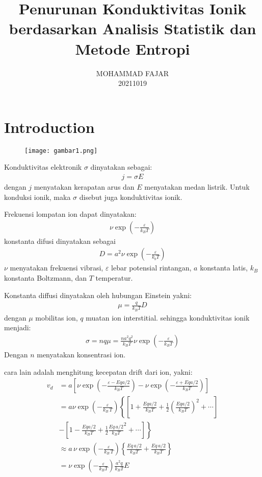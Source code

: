 \documentclass[a4paper , 12pt, cc]{article}
\title{Penurunan Konduktivitas Ionik berdasarkan Analisis Statistik dan Metode Entropi}
\author{MOHAMMAD FAJAR\\
20211019}
\begin{document}
\setlength \belowdisplayskip{2 pt} 
\setlength \abovedisplayskip{2 pt}
\maketitle

\section{Introduction}
\begin{figure}
\centering
\texttt{[image: gambar1.png]}
\end{figure}
Konduktivitas elektronik $\sigma$ dinyatakan sebagai:
\begin{align}
j = \sigma E \label{pers .1}
\end{align}
dengan $j$ menyatakan kerapatan arus dan $E$ menyatakan medan listrik. Untuk konduksi ionik, maka $\sigma$ disebut juga konduktivitas ionik. 

Frekuensi lompatan ion dapat dinyatakan:
\begin{align}
\nu \exp \left( - \frac{\varepsilon}{k_B T} \right)
\end{align}
konstanta difusi dinyatakan sebagai 
\begin{align}
D = a^2 \nu  \exp \left( - \frac{\varepsilon}{k_b T}\right)
\end{align}
  $\nu$ menyatakan frekuensi vibrasi, $\varepsilon$ lebar potensial rintangan, $a$ konstanta latis, $k_B$ konstanta Boltzmann, dan $T$ temperatur. 

 Konstanta diffusi dinyatakan  oleh hubungan Einstein yakni:
 \begin{align}
 \mu = \frac{q}{k_B T} D
 \end{align}
 dengan  $\mu$ mobilitas ion,   $q$ muatan ion interstitial. sehingga  konduktivitas ionik menjadi:
 \begin{align}
 \sigma  =  n q \mu  =  \frac{n a^2  q^2 }{k_B T}  \nu \exp  \left(  - \frac{\varepsilon}{k_B T}\right) \label{kond. ionik 1}
 \end{align}
 Dengan  $n$ menyatakan konsentrasi ion. 

  cara lain adalah menghitung  kecepatan drift dari ion, yakni:
    \begin{align}
    v_d&  = a \left[  \nu \exp \left(  - \frac{\varepsilon - Eqa/2}{k_B T}\right)  - \nu  \exp \left( - \frac{\varepsilon +  Eq  a/2 }{k_B T } \right)\right ] \nonumber   \\  
    & = a \nu \exp \left(  - \frac{\varepsilon}{k_B \, T}\right)  \left\{ \left[ 1+ \frac{Eqa/2}{k_B T}  + \frac{1}{2} \left( \frac{Eq a/2}{k_B T}\right)^2 + \cdots \right] \right.  \nonumber \\
    &\left.  - \left[ 1 - \frac{E q a/2}{k_B T} + \frac{1}{2} \frac{Eq \, a/2}{k_B T}^2 + \cdots  \right] \right\} \nonumber \\
    & \approx a \, \nu \exp \left( - \frac{\varepsilon }{k_B \, T}\right ) \left\{ \frac{Eq \, a/2}{k_B T}  + \frac{Eq \, a/2}{k_B T}\right \} 
     \nonumber \\
    & =  \nu \exp \left( - \frac{\varepsilon}{k_B T }\right)  \frac{a^2  q}{k_B T} E
    \end{align}
\end{document}
